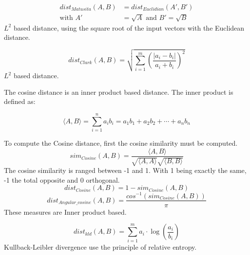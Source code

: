 \begin{definition}
  \begin{equation}
    \begin{split}
      dist_{Matusita}(A, B) &= dist_{Euclidian}(A', B') \\
      \text{with }A' &= \sqrt{A}\text{ and }B' = \sqrt{B}
    \end{split}
  \end{equation}
  $L^2$ based distance, using the square root of the input vectors with the Euclidean distance.
\end{definition}

\begin{definition}
  \begin{equation}
    dist_{Clark}(A, B) = \sqrt{\sum_{i=1}^{m}\left(\frac{|a_i - b_i|}{a_i + b_i}\right)^2}
  \end{equation}
  $L^2$ based distance.
\end{definition}

\begin{definition}
  \label{def:cosine_dist}
  The cosine distance is an inner product based distance.
  The inner product is defined as:

  \begin{equation}
    \langle A, B \rangle = \sum_{i=1}^{n} a_i b_i = a_1 b_1 + a_2 b_2 + \cdots + a_n b_n
  \end{equation}

  To compute the Cosine distance, first the cosine similarity must be computed.
  \begin{equation}
    sim_{Cosine}(A, B) = \frac{\langle A, B \rangle}{\sqrt{\langle A , A \rangle}\sqrt{\langle B, B \rangle}}
  \end{equation}
  The cosine similarity is ranged between -1 and 1.
  With 1 being exactly the same, -1 the total opposite and 0 orthogonal.
  \begin{equation}
    dist_{Cosine}(A, B) = 1 - sim_{Cosine}(A, B)
  \end{equation}
  \begin{equation}
    dist_{Angular\_cosine}(A, B) = \frac{cos^{-1}\left( sim_{Cosine}(A, B) \right)}{\pi}
  \end{equation}
  These measures are Inner product based.
\end{definition}

\begin{definition}
  \begin{equation}
    dist_{kld}(A, B) = \sum_{i=1}^{m} a_i \cdot \log(\frac{a_i}{b_i})
  \end{equation}
  Kullback-Leibler divergence use the principle of relative entropy.
\end{definition}

